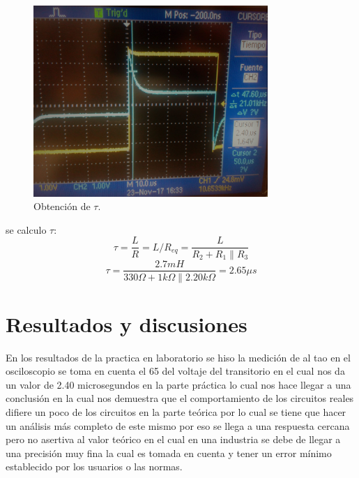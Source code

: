 \documentclass[12pt]{report}
\begin{document}
  \begin{figure}[h!]
  \centering
    \includegraphics[width=3.5in]{tran}
  \caption{Obtención de $\tau$.}
  \end{figure} 
se calculo $\tau$:
\begin{equation}
\tau =\frac{L}{R}=L/R_{eq}=\frac{L}{R_2 + R_1 \parallel R_3}
\end{equation}
\begin{equation}
\tau =\frac{2.7mH}{330 \Omega +1k \Omega \parallel 2.20k \Omega }=2.65 \mu s
\end{equation}
\chapter{Resultados y discusiones}
En los resultados de la practica en laboratorio se hiso la medición de al tao en el osciloscopio se toma en cuenta el 65 del voltaje del transitorio en el cual nos da un valor de 2.40 microsegundos en la parte práctica lo cual nos hace llegar a una conclusión en la cual nos demuestra que el comportamiento de los circuitos reales difiere un poco de los circuitos en la parte teórica por lo cual se tiene que hacer un análisis más completo de este mismo por eso se llega a una respuesta cercana pero no asertiva al valor teórico en el cual en una industria se debe de llegar a una precisión muy fina la cual es tomada en cuenta y tener un error mínimo establecido por los usuarios o las normas.
\end{document}
